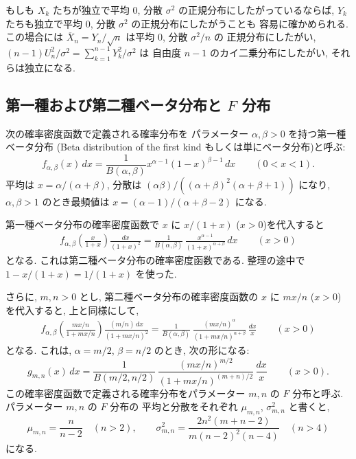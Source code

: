 \documentclass[12pt,twoside]{jarticle}
\newcommand\Xbar{{\overline X}}
\theoremstyle{jplain}
\theoremstyle{jplain}
\theoremstyle{jplain}
\numberwithin{theorem}{section}
\numberwithin{equation}{section}
\numberwithin{figure}{section}
\numberwithin{table}{section}
\begin{document}
もしも $X_k$ たちが独立で平均 $0$, 分散 $\sigma^2$ の正規分布にしたがっているならば, 
$Y_k$ たちも独立で平均 $0$, 分散 $\sigma^2$ の正規分布にしたがうことも
容易に確かめられる. この場合には $\Xbar_n=Y_n/\sqrt{n}$ は平均 $0$, 分散 $\sigma^2/n$ の
正規分布にしたがい, $(n-1)U_n^2/\sigma^2=\sum_{k=1}^{n-1}Y_k^2/\sigma^2$ は
自由度 $n-1$ のカイ二乗分布にしたがい, それらは独立になる. 




\subsection{第一種および第二種ベータ分布と $F$ 分布}
\label{sec:Beta1st}

次の確率密度函数で定義される確率分布を
パラメーター $\alpha,\beta>0$ を持つ第一種ベータ分布
(Beta distribution of the first kind もしくは単にベータ分布)と呼ぶ:
\[
f_{\alpha,\beta}(x)\,dx
=\frac{1}{B(\alpha,\beta)} x^{\alpha-1}(1-x)^{\beta-1}\,dx
\qquad (0<x<1).
\]
平均は $x=\alpha/(\alpha+\beta)$, 
分散は $(\alpha\beta)/((\alpha+\beta)^2(\alpha+\beta+1))$ になり, 
$\alpha,\beta>1$ のとき最頻値は $x=(\alpha-1)/(\alpha+\beta-2)$ になる.

第一種ベータ分布の確率密度函数で $x$ に $x/(1+x)$ ($x>0$)を代入すると
\begin{align*}
f_{\alpha,\beta}\left(\frac{x}{1+x}\right)\frac{dx}{(1+x)^2}
=
\frac{1}{B(\alpha,\beta)}\,
\frac{x^{\alpha-1}}{(1+x)^{\alpha+\beta}}\,dx
\qquad (x>0)
\end{align*}
となる. これは第二種ベータ分布の確率密度函数である.  
整理の途中で $1-x/(1+x)=1/(1+x)$ を使った.

さらに, $m,n>0$ とし, 
第二種ベータ分布の確率密度函数の $x$ に $mx/n$ ($x>0$) を代入すると, 
上と同様にして, 
\begin{align*}
f_{\alpha,\beta}\left( \frac{mx/n}{1+mx/n} \right) \frac{(m/n)\,dx}{(1+mx/n)^2}
=
\frac{1}{B(\alpha,\beta)}\,
\frac{(mx/n)^\alpha}{(1+mx/n)^{\alpha+\beta}}
\,\frac{dx}{x}
\qquad (x>0)
\end{align*}
となる.  これは, $\alpha=m/2$, $\beta=n/2$ のとき, 次の形になる:
\[
g_{m,n}(x)\,dx
=
\frac{1}{B(m/2,n/2)}\,
\frac{(mx/n)^{m/2}}{(1+mx/n)^{(m+n)/2}}
\,\frac{dx}{x}
\qquad (x>0).
\]
この確率密度函数で定義される確率分布をパラメーター $m,n$ の $F$ 分布と呼ぶ.
パラメーター $m,n$ の $F$ 分布の
平均と分散をそれぞれ $\mu_{m,n}$, $\sigma_{m,n}^2$ と書くと, 
\[
\mu_{m,n}=\frac{n}{n-2} \quad (n>2), \qquad
\sigma_{m,n}^2 = \frac{2n^2(m+n-2)}{m(n-2)^2(n-4)} \quad (n>4)
\]
になる. 
\end{document}
